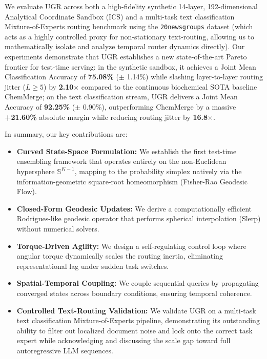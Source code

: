 We evaluate UGR across both a high-fidelity synthetic 14-layer, 192-dimensional Analytical Coordinate Sandbox (ICS) and a multi-task text classification Mixture-of-Experts routing benchmark using the \texttt{20newsgroups} dataset (which acts as a highly controlled proxy for non-stationary text-routing, allowing us to mathematically isolate and analyze temporal router dynamics directly). Our experiments demonstrate that UGR establishes a new state-of-the-art Pareto frontier for test-time serving: in the synthetic sandbox, it achieves a Joint Mean Classification Accuracy of \textbf{75.08\%} ($\pm$ 1.14\%) while slashing layer-to-layer routing jitter ($L \ge 5$) by \textbf{2.10$\times$} compared to the continuous biochemical SOTA baseline ChemMerge; on the text classification stream, UGR delivers a Joint Mean Accuracy of \textbf{92.25\%} ($\pm$ 0.90\%), outperforming ChemMerge by a massive \textbf{+21.60\%} absolute margin while reducing routing jitter by \textbf{16.8$\times$}.

In summary, our key contributions are:
\begin{itemize}
    \item \textbf{Curved State-Space Formulation:} We establish the first test-time ensembling framework that operates entirely on the non-Euclidean hypersphere $\mathbb{S}^{K-1}$, mapping to the probability simplex natively via the information-geometric square-root homeomorphism (Fisher-Rao Geodesic Flow).
    \item \textbf{Closed-Form Geodesic Updates:} We derive a computationally efficient Rodrigues-like geodesic operator that performs spherical interpolation (Slerp) without numerical solvers.
    \item \textbf{Torque-Driven Agility:} We design a self-regulating control loop where angular torque dynamically scales the routing inertia, eliminating representational lag under sudden task switches.
    \item \textbf{Spatial-Temporal Coupling:} We couple sequential queries by propagating converged states across boundary conditions, ensuring temporal coherence.
    \item \textbf{Controlled Text-Routing Validation:} We validate UGR on a multi-task text classification Mixture-of-Experts pipeline, demonstrating its outstanding ability to filter out localized document noise and lock onto the correct task expert while acknowledging and discussing the scale gap toward full autoregressive LLM sequences.
\end{itemize}
